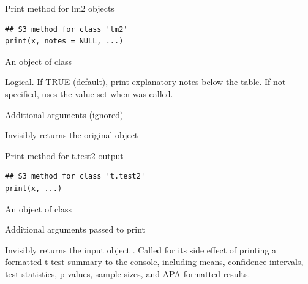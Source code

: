 \documentclass[a4paper]{book}
\begin{document}
%
\begin{Description}
Print method for lm2 objects
\end{Description}
%
\begin{Usage}
\begin{verbatim}
## S3 method for class 'lm2'
print(x, notes = NULL, ...)
\end{verbatim}
\end{Usage}
%
\begin{Arguments}
\begin{ldescription}
\item[\code{x}] An object of class 

\item[\code{notes}] Logical. If TRUE (default), print explanatory notes below the table.
If not specified, uses the value set when  was called.

\item[\code{...}] Additional arguments (ignored)
\end{ldescription}
\end{Arguments}
%
\begin{Value}
Invisibly returns the original object
\end{Value}
%
\begin{Description}
Print method for t.test2 output
\end{Description}
%
\begin{Usage}
\begin{verbatim}
## S3 method for class 't.test2'
print(x, ...)
\end{verbatim}
\end{Usage}
%
\begin{Arguments}
\begin{ldescription}
\item[\code{x}] An object of class 

\item[\code{...}] Additional arguments passed to print
\end{ldescription}
\end{Arguments}
%
\begin{Value}
Invisibly returns the input object . Called for its side effect 
of printing a formatted t-test summary to the console, including means, 
confidence intervals, test statistics, p-values, sample sizes, and 
APA-formatted results.
\end{Value}
\end{document}
